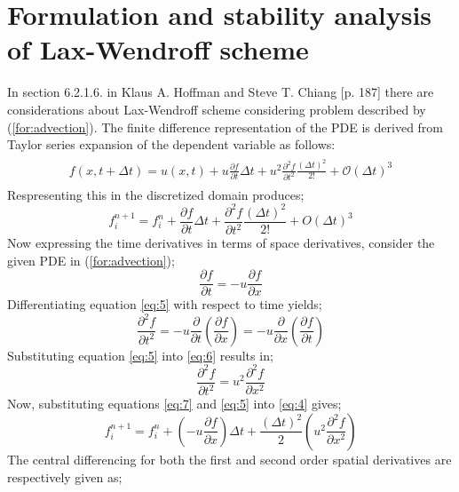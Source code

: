 \section{Formulation and stability analysis of Lax-Wendroff scheme}
	In section 6.2.1.6. in Klaus A. Hoffman and Steve T. Chiang \cite{bib:hoffman}[p. 187] there are considerations about Lax-Wendroff scheme considering problem described by (\ref{for:advection}). The finite difference representation of the PDE is derived from Taylor series expansion of the dependent variable as follows: 	
	\begin{align}
		\begin{split}
			f(x, t + \Delta t) = u(x, t) + u\frac{\partial f}{\partial t}\Delta t + u^2\frac{\partial ^2 f}{\partial t^2}\frac{(\Delta t)^2}{2!} + \mathcal{O}(\Delta t)^3
		\end{split}
	\end{align}	
	Respresenting this in the discretized domain produces;
	\begin{equation}
		f^{n+1}_{i} = f^{n}_{i} + \frac{\partial f}{\partial t}\Delta t + \frac{\partial^2 f}{\partial t^2}\frac{(\Delta t)^2}{2!} + O(\Delta t)^3 \label{eq:4}
	\end{equation}
	Now expressing the time derivatives in terms of space derivatives, consider the given PDE in (\ref{for:advection});
	\begin{equation}
		\frac{\partial f}{\partial t} = - u \frac{\partial f}{\partial x} \label{eq:5}
	\end{equation}
	Differentiating equation \eqref{eq:5} with respect to time yields;
	\begin{equation}
		\frac{\partial^2 f}{\partial t^2} = -u\frac{\partial}{\partial t}\left(\frac{\partial f}{\partial x}\right) = -u\frac{\partial}{\partial x}\left(\frac{\partial f}{\partial t}\right) \label{eq:6}
	\end{equation}
	Substituting equation \eqref{eq:5} into \eqref{eq:6} results in;
	\begin{equation}
		\frac{\partial^2 f}{\partial t^2} = u^2\frac{\partial^2 f}{\partial x^2} \label{eq:7}
	\end{equation}
	Now, substituting equations \eqref{eq:7} and \eqref{eq:5} into \eqref{eq:4} gives;
	\begin{equation}
		f^{n+1}_{i} = f^{n}_{i} + \left(- u \frac{\partial f}{\partial x}\right) \Delta t + \frac{(\Delta t)^2}{2}\left(u^2\frac{\partial^2 f}{\partial x^2}\right) \label{eq:8}
	\end{equation}
	The central differencing for both the first and second order spatial derivatives are respectively given as;
